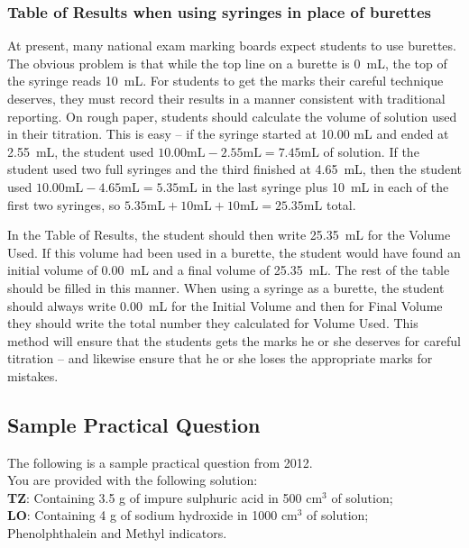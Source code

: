 \subsubsection{Table of Results when using syringes in place of burettes}

At present, many national exam marking boards expect students to use burettes. The obvious problem is that while the top line on a burette is 0~mL, the top of the syringe reads 10~mL. For students to get the marks their careful technique deserves, they must record their results in a manner consistent with traditional reporting. On rough paper, students should calculate the volume of solution used in their titration. This is easy -- if the syringe started at 10.00 mL and ended at 2.55~mL, the student used $10.00 \mathrm{mL} - 2.55 \mathrm{mL} = 7.45 \mathrm{mL}$ of solution. If the student used two full syringes and the third finished at 4.65~mL, then the student used $10.00 \mathrm{mL} - 4.65 \mathrm{mL} = 5.35 \mathrm{mL}$ in the last syringe plus 10~mL in each of the first two syringes, so $5.35 \mathrm{mL} + 10 \mathrm{mL} + 10 \mathrm{mL} = 25.35 \mathrm{mL}$ total.

In the Table of Results, the student should then write 25.35~mL for the Volume Used. If this volume had been used in a burette, the student would have found an initial volume of 0.00~mL and a final volume of 25.35~mL. The rest of the table should be filled in this manner. When using a syringe as a burette, the student should always write 0.00~mL for the Initial Volume and then for Final Volume they should write the total number they calculated for Volume Used. This method will ensure that the students gets the marks he or she deserves for careful titration – and likewise ensure that he or she loses the appropriate marks for mistakes.

\subsection{Sample Practical Question}
The following is a sample practical question from 2012.\\


\noindent You are provided with the following solution:\\

\noindent \textbf{TZ}: Containing 3.5 g of impure sulphuric acid in 500 cm$^3$ of solution;\\
\textbf{LO}: Containing 4 g of sodium hydroxide in 1000 cm$^3$ of solution;\\
Phenolphthalein and Methyl indicators.\\

